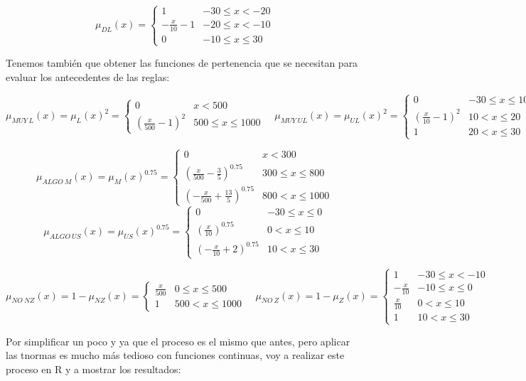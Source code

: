 \documentclass[
]{article}
\begin{document}
\[\mu_{DL}\left(x\right)=\begin{cases}
1 & -30\leq x<-20\\
-\frac{x}{10}-1 & -20\leq x<-10\\
0 & -10\leq x\leq30
\end{cases}\]

Tenemos también que obtener las funciones de pertenencia que se
necesitan para evaluar los antecedentes de las reglas:

\[\mu_{MUY\ L}\left(x\right)=\mu_{L}\left(x\right)^{2}=\begin{cases}
0 & x<500\\
\left(\frac{x}{500}-1\right)^{2} & 500\leq x\leq1000
\end{cases} \quad \mu_{MUY\ UL}\left(x\right)=\mu_{UL}\left(x\right)^{2}=\begin{cases}
0 & -30\leq x\leq10\\
\left(\frac{x}{10}-1\right)^{2} & 10<x\leq20\\
1 & 20<x\leq30
\end{cases}\]

\[\mu_{ALGO\ M}\left(x\right)=\mu_{M}\left(x\right)^{0.75}=\begin{cases}
0 & x<300\\
\left(\frac{x}{500}-\frac{3}{5}\right)^{0.75} & 300\leq x\leq800\\
\left(-\frac{x}{500}+\frac{13}{5}\right)^{0.75} & 800<x\leq1000
\end{cases}\]
\[\mu_{ALGO\ US}\left(x\right)=\mu_{US}\left(x\right)^{0.75}=\begin{cases}
0 & -30\leq x\leq0\\
\left(\frac{x}{10}\right)^{0.75} & 0<x\leq10\\
\left(-\frac{x}{10}+2\right)^{0.75} & 10<x\leq30
\end{cases}\]

\[\mu_{NO\ NZ}\left(x\right)=1-\mu_{NZ}\left(x\right)=\begin{cases}
\frac{x}{500} & 0\leq x\leq500\\
1 & 500<x\leq1000
\end{cases} \quad \mu_{NO\ Z}\left(x\right)=1-\mu_{Z}\left(x\right)=\begin{cases}
1 & -30\leq x<-10\\
-\frac{x}{10} & -10\leq x\leq0\\
\frac{x}{10} & 0<x\leq10\\
1 & 10<x\leq30
\end{cases}\]

Por simplificar un poco y ya que el proceso es el mismo que antes, pero
aplicar las tnormas es mucho más tedioso con funciones continuas, voy a
realizar este proceso en R y a mostrar los resultados:
\end{document}
